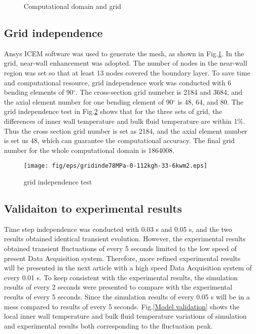 \documentclass[a4paper,12pt]{article}
\begin{document}
\begin{figure}
	\centering
	\caption{Computational domain and grid}\label{Computational domain}
\end{figure}

\subsection{Grid independence}


Ansys ICEM software was used to generate the mesh, as shown in Fig.\ref{Computational domain}.  In the grid, near-wall enhancement was adopted. The number of nodes in the near-wall region was set so that at least 13 nodes covered the boundary layer. To save time and computational resource, grid independence work was conducted with 6 bending elements of 90$^{\circ}$. The cross-section grid numeber is 2184 and 3684, and the axial element number for one bending element of 90$^{\circ}$ is 48, 64, and 80. The grid independence test in Fig.\ref{gridinde} shows that for the three sets of grid, the differences of inner wall temperature and bulk fluid temperature are within 1$\%$. Thus the cross section grid number is set as 2184, and the axial element number is set us 48, which can guarantee the computational accuracy. The final grid number for the whole computational domain is 1864008. 
\begin{figure}
	\centering
	\texttt{[image: fig/eps/gridinde78MPa-0-112kgh-33-6kwm2.eps]}
	\caption{grid independence test}\label{gridinde}
\end{figure}
\subsection{Validaiton to experimental results}
Time step independence was conducted with 0.03 s and 0.05 s, and the two results obtained identical transient evolution. However, the experimental results obtained transient fluctuations of every 5 seconds limited to the low speed of present Data Acquisition system. Therefore, more refined experimental results will be presented in the next article with a high speed Data Acquisition system of every 0.01 s. To keep consistent with the experimental results, the simulation results of every 2 seconds were presented to compare with the experimental results of every 5 seconds. Since the simulation results of every 0.05 s will be in a mess compared to results of every 5 seconds. Fig.\ref{Model validation} shows the local inner wall temperature and bulk fluid temperature variations of simulation and experimental results both corresponding to the fluctuation peak. 
\end{document}
